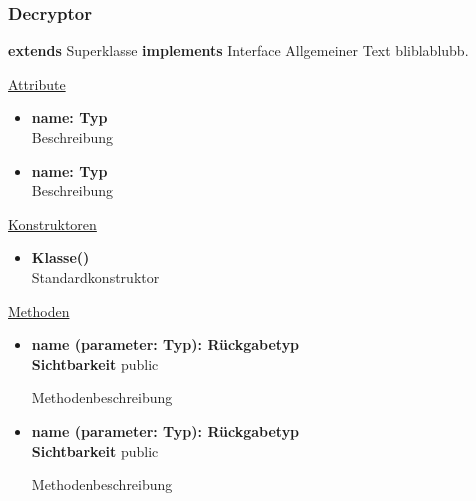 \subsubsection{Decryptor}
\textbf{extends} Superklasse \newline
\textbf{implements} Interface \newline
Allgemeiner Text bliblablubb. \newline

\underline{Attribute}
\begin{itemize}
\itemsep0pt
\item \textbf{name: Typ} \hfill\\ 
Beschreibung

\item \textbf{name: Typ} \hfill\\ 
Beschreibung
\end{itemize}

\underline{Konstruktoren}
\begin{itemize}
\itemsep0pt
\item \textbf{Klasse()} \hfill\\
Standardkonstruktor
\end{itemize}

\underline{Methoden}
\begin{itemize}
\itemsep0pt
\item \textbf{name (parameter: Typ): Rückgabetyp}\hfill\\
\textbf{Sichtbarkeit} public

Methodenbeschreibung

\item \textbf{name (parameter: Typ): Rückgabetyp}\hfill\\
\textbf{Sichtbarkeit} public

Methodenbeschreibung

\end{itemize}